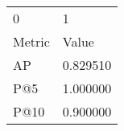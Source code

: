 \begin{tabular}{ll}
0 & 1 \\
Metric & Value \\
AP & 0.829510 \\
P@5 & 1.000000 \\
P@10 & 0.900000 \\
\end{tabular}
